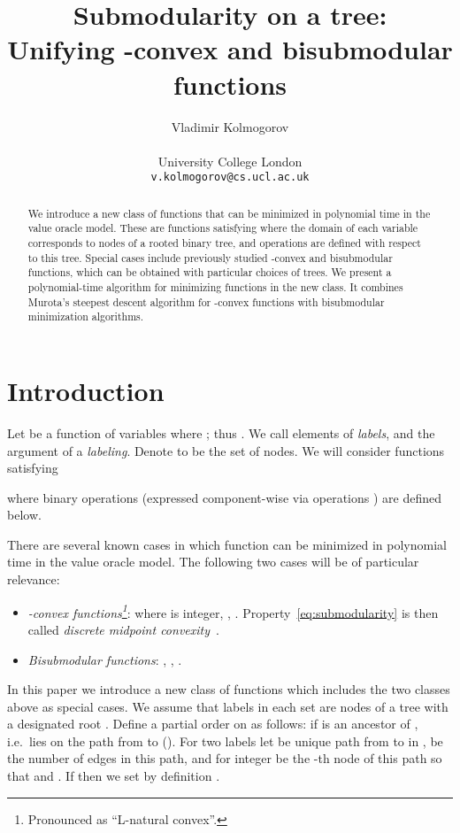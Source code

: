 \documentclass[11pt,onecolumn]{article}
\begin{document}
\title{Submodularity on a tree: \\ Unifying -convex and bisubmodular functions}
\author{Vladimir Kolmogorov \\ ~ \\ \normalsize University College London \\ {\normalsize\tt v.kolmogorov@cs.ucl.ac.uk} }
\date{}

\maketitle              
\begin{abstract}
We introduce a new class of functions that can be minimized in polynomial time in the value oracle model.
These are functions  satisfying 
where the domain of each variable  corresponds to nodes of a rooted binary tree, and 
operations  are defined with respect to this tree.
Special cases include previously studied -convex and bisubmodular functions,
which can be obtained with particular choices of trees.
We present a polynomial-time algorithm for minimizing functions in the new class.
It combines Murota's steepest descent algorithm for -convex functions
with bisubmodular minimization algorithms.

\end{abstract}
\section{Introduction}\label{sec:intro}
Let  be a function of  variables  where ;
thus . We call elements of  {\em labels}, and the argument of  a {\em labeling}. 
Denote  to be the set of nodes. 
We will consider functions  satisfying

where binary operations  (expressed component-wise via operations )
are defined below.

There are several known cases in which function  can be minimized in polynomial time in the value oracle model.
The following two cases will be of particular relevance:
\begin{itemize}
\item {\em -convex functions\footnote{Pronounced as ``L-natural convex''.}}:  where  is integer, 
,
. Property~\eqref{eq:submodularity} is then called {\em discrete midpoint convexity}~\cite{Murota:book}.
\item {\em Bisubmodular functions}: , , 
.
\end{itemize}

In this paper we introduce a new class of functions which includes the two classes above as special cases.
We assume that labels in each set  are nodes of a tree  with a designated root .
Define a partial order  on  as follows:  if  is an ancestor of ,
i.e.\  lies on the path from  to  (). For two labels  let  be unique path from  to  in ,
 be the number of edges in this path, and  for integer  be the -th node of this path
so that  and . If  then we set by definition .
\end{document}
